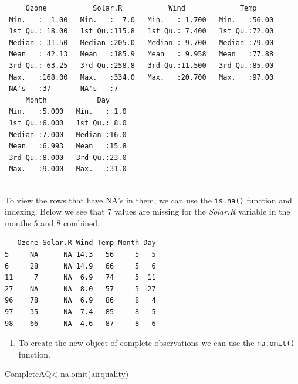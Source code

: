 \documentclass[
  letterpaper,
  DIV=11,
  numbers=noendperiod]{scrreprt}
\newenvironment{Shaded}{\begin{snugshade}}{\end{snugshade}}
\newcommand{\FunctionTok}[1]{\textcolor[rgb]{0.28,0.35,0.67}{#1}}
\newcommand{\NormalTok}[1]{\textcolor[rgb]{0.00,0.23,0.31}{#1}}
\newcommand{\OtherTok}[1]{\textcolor[rgb]{0.00,0.23,0.31}{#1}}
\newcommand{\SpecialCharTok}[1]{\textcolor[rgb]{0.37,0.37,0.37}{#1}}
\providecommand{\tightlist}{%
  \setlength{\itemsep}{0pt}\setlength{\parskip}{0pt}}\usepackage{longtable,booktabs,array}
\begin{document}
\begin{verbatim}
     Ozone           Solar.R           Wind             Temp      
 Min.   :  1.00   Min.   :  7.0   Min.   : 1.700   Min.   :56.00  
 1st Qu.: 18.00   1st Qu.:115.8   1st Qu.: 7.400   1st Qu.:72.00  
 Median : 31.50   Median :205.0   Median : 9.700   Median :79.00  
 Mean   : 42.13   Mean   :185.9   Mean   : 9.958   Mean   :77.88  
 3rd Qu.: 63.25   3rd Qu.:258.8   3rd Qu.:11.500   3rd Qu.:85.00  
 Max.   :168.00   Max.   :334.0   Max.   :20.700   Max.   :97.00  
 NA's   :37       NA's   :7                                       
     Month            Day      
 Min.   :5.000   Min.   : 1.0  
 1st Qu.:6.000   1st Qu.: 8.0  
 Median :7.000   Median :16.0  
 Mean   :6.993   Mean   :15.8  
 3rd Qu.:8.000   3rd Qu.:23.0  
 Max.   :9.000   Max.   :31.0  
                               
\end{verbatim}

To view the rows that have NA's in them, we can use the \texttt{is.na()}
function and indexing. Below we see that \(7\) values are missing for
the \emph{Solar.R} variable in the months \(5\) and \(8\) combined.

\begin{Shaded}
\end{Shaded}

\begin{verbatim}
   Ozone Solar.R Wind Temp Month Day
5     NA      NA 14.3   56     5   5
6     28      NA 14.9   66     5   6
11     7      NA  6.9   74     5  11
27    NA      NA  8.0   57     5  27
96    78      NA  6.9   86     8   4
97    35      NA  7.4   85     8   5
98    66      NA  4.6   87     8   6
\end{verbatim}

\begin{enumerate}
\def\labelenumi{\arabic{enumi}.}
\setcounter{enumi}{3}
\tightlist
\item
  To create the new object of complete observations we can use the
  \texttt{na.omit()} function.
\end{enumerate}

\begin{Shaded}
\begin{Highlighting}[numbers=left,,]
\NormalTok{CompleteAQ}\OtherTok{\textless{}{-}}\FunctionTok{na.omit}\NormalTok{(airquality)}
\end{Highlighting}
\end{Shaded}
\end{document}
